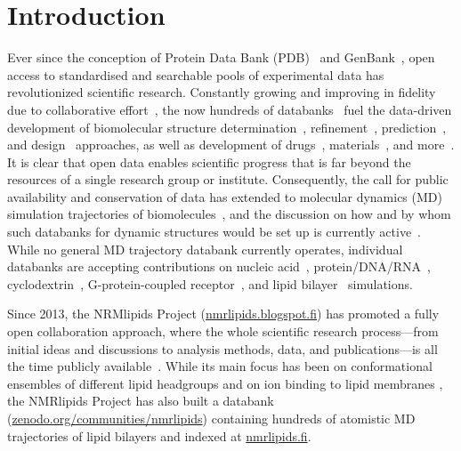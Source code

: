 \documentclass[journal=jcisd8,manuscript=article,layout=twocolumn]{achemso}
\begin{document}
\section{Introduction}
Ever since the conception of Protein Data Bank (PDB)~\cite{nnb1971,wwPDB2019} and GenBank~\cite{jordan1982,sayers2020},
open access to standardised and searchable pools of experimental data has
revolutionized
scientific
research. %
Constantly growing and improving in fidelity
due to collaborative effort~\cite{levitt2007,Brzezinski:2020a,Harris:2003a,Steinegger:2020a}, %
the now hundreds of databanks~\cite{Rigden:2020a}
fuel the data-driven development of
biomolecular structure determination~\cite{Simpkin:2019a},
refinement~\cite{Leelananda:2020a}, %
prediction~\cite{Senior:2020a}, and
design~\cite{huang2016} approaches,
as well as development of
drugs~\cite{Westbrook:2019a,Martinez-Mayorga:2020a}, %
materials~\cite{Senderowitz:2018a,Wan:2019a},
and more~\cite{Perez-Riverol:2019a,Feng:2020a}.
It is clear that open data enables scientific
progress that is far beyond the resources of a single research group or institute.
%
Consequently,
the call for public availability and conservation of data has extended to molecular dynamics (MD) simulation trajectories of biomolecules~\cite{Feig:1999a,Tai:2004a,Silva:2006a}, and the discussion on how and by whom such databanks for dynamic structures would be set up is currently active~\cite{Hildebrand:2019a,Abraham:2019a,Abriata:2020a,Hospital:2020a}.
%
While no general MD trajectory databank %
currently operates,
individual databanks are accepting contributions on
nucleic acid~\cite{Hospital:2016a}, %
protein/DNA/RNA~\cite{Bekker:2020a}, %
cyclodextrin~\cite{Mixcoha:2016a}, %
G-protein-coupled receptor~\cite{Rodriguez-Espigares:2019a}, %
and lipid bilayer~\cite{Miettinen:2019c} %
simulations.

Since 2013, the NRMlipids Project (\url{nmrlipids.blogspot.fi}) has
promoted a fully open collaboration approach, where
the whole scientific research process---from initial ideas and discussions to
analysis methods, data, and publications---is all the time publicly available~\cite{botan15}.
While its main focus has been on conformational ensembles
of different lipid headgroups and on ion binding to lipid membranes \cite{botan15,catte16,Antila:2019a},
the NMR\-lipids Project has also built a databank~\cite{Miettinen:2019c} (\url{zenodo.org/communities/nmrlipids}) containing hundreds
of atomistic MD trajectories of lipid bilayers and
indexed at \url{nmrlipids.fi}.
\end{document}
